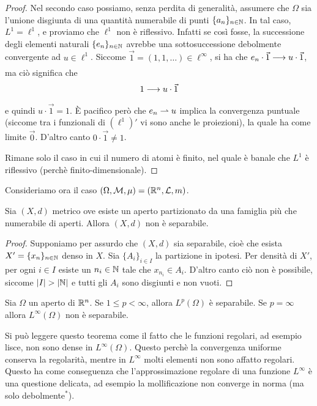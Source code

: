 \begin{proof}
	Nel secondo caso possiamo, senza perdita di generalità, assumere che $\Omega$ sia l'unione disgiunta di una quantità numerabile di punti $\{a_n\}_{n \in \mathbb{N}}$.
	In tal caso, $L^1 = \ell^1$, e proviamo che $\ell^1$ non è riflessivo.
	Infatti se così fosse, la successione degli elementi naturali $\{e_n\}_{n \in \mathbb{N}}$ avrebbe una sottosuccessione debolmente convergente ad $u \in \ell^1$. Siccome $\vec 1 =(1,1, \ldots) \in \ell^\infty$, si ha che $e_n \cdot \vec 1 \underset{{}}{\longrightarrow} u \cdot \vec 1$, ma ciò significa che
	\begin{equation*}
		1 \underset{{}}{\longrightarrow} u \cdot \vec 1
	\end{equation*}
	e quindi $u \cdot \vec 1 = 1$.
	È pacifico però che $e_n \rightharpoonup u$ implica la convergenza puntuale (siccome tra i funzionali di $(\ell^1)'$ vi sono anche le proiezioni), la quale ha come limite $\vec 0$. D'altro canto $0 \cdot \vec 1 \neq 1$.

	Rimane solo il caso in cui il numero di atomi è finito, nel quale è banale che $L^1$ è riflessivo (perchè finito-dimensionale).
\end{proof}

Consideriamo ora il caso $(\Omega, \mathcal{M}, \mu) = (\mathbb{R}^n, \mathcal{L}, m)$.

\begin{lemma}
\label{lemma:neg_sep_lemma}
	Sia $(X,d)$ metrico ove esiste un aperto partizionato da una famiglia più che numerabile di aperti.
	Allora $(X,d)$ non è separabile.
\end{lemma}
\begin{proof}
	Supponiamo per assurdo che $(X,d)$ sia separabile, cioè che esista $X'=\{x_n\}_{n \in \mathbb{N}}$ denso in $X$. Sia $\{A_i\}_{i \in I}$ la partizione in ipotesi.
	Per densità di $X'$, per ogni $i \in I$ esiste un $n_i \in \mathbb{N}$ tale che $x_{n_i} \in A_i$.
	D'altro canto ciò non è possibile, siccome $\left|{I}\right| > \left|{\mathbb{N}}\right|$ e tutti gli $A_i$ sono disgiunti e non vuoti.
\end{proof}

\begin{theorem}
	Sia $\Omega$ un aperto di $\mathbb{R}^n$. Se $1 \leq p < \infty$, allora $L^p(\Omega)$ è separabile. Se $p=\infty$ allora $L^\infty(\Omega)$ non è separabile.
\end{theorem}

\begin{remark}
	Si può leggere questo teorema come il fatto che le funzioni regolari, ad esempio lisce, non sono dense in $L^\infty(\Omega)$. Questo perchè la convergenza uniforme conserva la regolarità, mentre in $L^\infty$ molti elementi non sono affatto regolari.
	Questo ha come conseguenza che l'approssimazione regolare di una funzione $L^\infty$ è una questione delicata, ad esempio la mollificazione non converge in norma (ma solo debolmente$^*$).
\end{remark}

